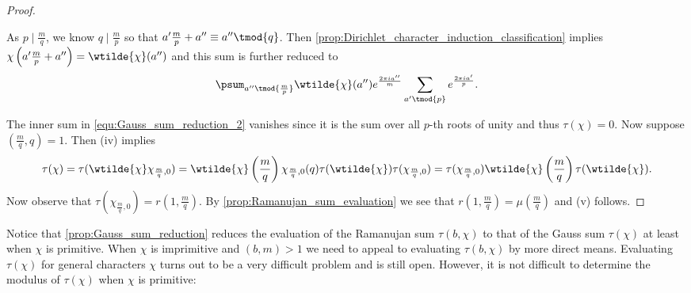 \begin{proof}
\begin{enumerate}[label=(\roman*)]
\[            \]
            As $p \mid \frac{m}{q}$, we know $q \mid \frac{m}{p}$ so that $a'\frac{m}{p}+a'' \equiv a'' \tmod{q}$. Then \cref{prop:Dirichlet_character_induction_classification} implies $\chi\left(a'\frac{m}{p}+a''\right) = \wtilde{\chi}(a'')$ and this sum is further reduced to
            \begin{equation}\label{equ:Gauss_sum_reduction_2}
              \psum_{a'' \tmod{\frac{m}{p}}}\wtilde{\chi}(a'')e^{\frac{2\pi ia''}{m}}\sum_{a' \tmod{p}}e^{\frac{2\pi ia'}{p}}.
            \end{equation}
          \end{enumerate}
          The inner sum in \cref{equ:Gauss_sum_reduction_2} vanishes since it is the sum over all $p$-th roots of unity and thus $\tau(\chi) = 0$. Now suppose $\left(\frac{m}{q},q\right) = 1$. Then (iv) implies
          \[
            \tau(\chi) = \tau(\wtilde{\chi}\chi_{\frac{m}{q},0}) = \wtilde{\chi}\left(\frac{m}{q}\right)\chi_{\frac{m}{q},0}(q)\tau(\wtilde{\chi})\tau(\chi_{\frac{m}{q},0}) = \tau(\chi_{\frac{m}{q},0})\wtilde{\chi}\left(\frac{m}{q}\right)\tau(\wtilde{\chi}).
          \]
          Now observe that $\tau(\chi_{\frac{m}{q},0}) = r\left(1,\frac{m}{q}\right)$. By \cref{prop:Ramanujan_sum_evaluation} we see that $r\left(1,\frac{m}{q}\right) = \mu\left(\frac{m}{q}\right)$ and (v) follows.
        \end{proof}

        Notice that \cref{prop:Gauss_sum_reduction} reduces the evaluation of the Ramanujan sum $\tau(b,\chi)$ to that of the Gauss sum $\tau(\chi)$ at least when $\chi$ is primitive. When $\chi$ is imprimitive and $(b,m) > 1$ we need to appeal to evaluating $\tau(b,\chi)$ by more direct means. Evaluating $\tau(\chi)$ for general characters $\chi$ turns out to be a very difficult problem and is still open. However, it is not difficult to determine the modulus of $\tau(\chi)$ when $\chi$ is primitive:

